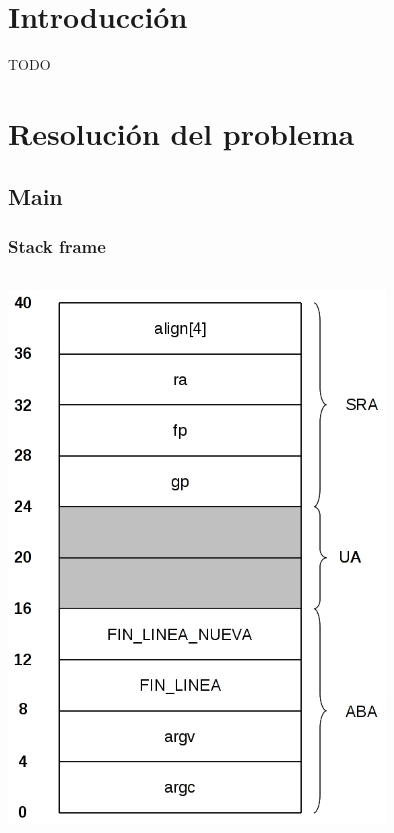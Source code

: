 \documentclass[a4paper,10pt]{article}
\begin{document}

\setcounter{page}{2}

\newpage
\thispagestyle{empty}
\tableofcontents

\newpage
\section{Introducci\'on}
  TODO

\section{Resoluci\'on del problema}

  \subsection{Main}
    \subsubsection{Stack frame}
      \begin{center}
	\includegraphics[width=10cm, height=15cm]{DibujosStackFrame/stack-main.jpg}
      \end{center}
\end{document}
